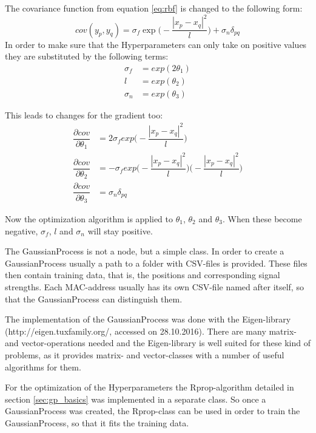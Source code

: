 The covariance function from equation \ref{eq:rbf} is changed to the following form:
\begin{equation}
cov(y_p,y_q) = \sigma_f \exp\bigg(-\dfrac{|x_p-x_q|^2}{l}\bigg) + \sigma_n \delta_{pq}
\end{equation}
In order to make sure that the \gls{Hyperparameter}s can only take on positive values they are substituted by the following terms:
\begin{equation}
\begin{aligned}
\sigma_f &= exp(2\theta_1)\\
l &= exp(\theta_2)\\
\sigma_n &= exp(\theta_3)
\end{aligned}
\end{equation}

This leads to changes for the gradient too:
\begin{equation}
\begin{aligned}
\dfrac{\partial cov}{\partial \theta_1} &= 2\sigma_f exp\bigg(-\dfrac{|x_p-x_q|^2}{l}\bigg)\\
\dfrac{\partial cov}{\partial \theta_2} &= -\sigma_f exp\bigg(-\dfrac{|x_p-x_q|^2}{l}\bigg)\bigg(-\dfrac{|x_p-x_q|^2}{l}\bigg)\\
\dfrac{\partial cov}{\partial \theta_3} &= \sigma_n\delta_{pq}
\end{aligned}
\end{equation}

Now the optimization algorithm is applied to $\theta_1$, $\theta_2$ and $\theta_3$. When these become negative, $\sigma_f$, $l$ and $\sigma_n$ will stay positive. 

The \Gls{GaussianProcess} is not a node, but a simple class. In order to create a \Gls{GaussianProcess} usually a path to a folder with CSV-files is provided. These files then contain training data, that is, the positions and corresponding signal strengths. Each \Gls{MAC-address} usually has its own CSV-file named after itself, so that the \Gls{GaussianProcess} can distinguish them.

The implementation of the \Gls{GaussianProcess} was done with the Eigen-library (http://eigen.tuxfamily.org/, accessed on 28.10.2016). There are many matrix- and vector-operations needed and the Eigen-library is well suited for these kind of problems, as it provides matrix- and vector-classes with a number of useful algorithms for them. 

For the optimization of the \gls{Hyperparameter}s the Rprop-algorithm detailed in section \ref{sec:gp_basics} was implemented in a separate class. So once a \Gls{GaussianProcess} was created, the Rprop-class can be used in order to train the \Gls{GaussianProcess}, so that it fits the training data. 

